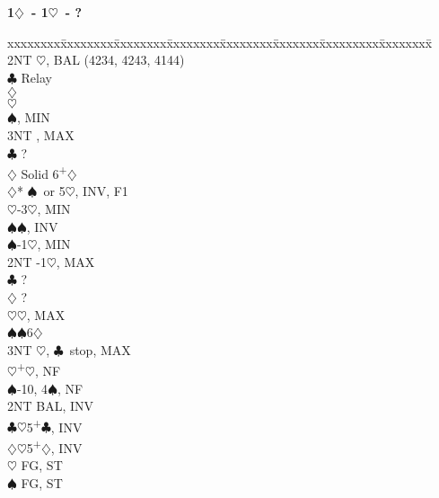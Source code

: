 \documentclass[10pt]{article}
\renewcommand{\c}{$\clubsuit$}
\renewcommand{\d}{$\diamondsuit$}
\newcommand{\h}{$\heartsuit$}
\newcommand{\s}{$\spadesuit$}
\newcommand{\p}{\textsuperscript{+}}
\newenvironment{bidtable}[1][]
{\textbf{#1}
  \begin{adjustwidth}{1em}{}
    \addvspace{2pt}
    \begin{tabbing}
      xxxxxxxx\=xxxxxxxx\=xxxxxxxx\=xxxxxxxx\=xxxxxxxx\=xxxxxxx\=xxxxxxxxx\=xxxxxxxx\=\kill}
{\end{tabbing}\end{adjustwidth}\bigskip}%
\begin{document}
\begin{bidtable}[1\d\ - 1\h\ - ?]
     \>      \> 2NT \h, BAL (4234, 4243, 4144)              \\
     \>      \>     \c  \> Relay                            \\
     \>      \>     \>      \d   {}                    \\
     \>      \>     \>      \h   {}                    \\
     \>      \>     \>      \s   {}, MIN               \\
     \>      \>     \>      \> 3NT   , MAX               \\
     \>      \c \> ?                                        \\
     \>      \d \> Solid 6\p\d                              \\
     \d* {}\s\ or 5\h, INV, F1                            \\
     \>      \h {}-3\h, MIN                               \\
     \>      \>     \s  {}\s, INV                         \\
     \>      \s {}-1\h, MIN                               \\
     \>      \> 2NT -1\h, MAX                               \\
     \>      \c \> ?                                        \\
     \>      \d \> ?                                        \\
     \>      \h {}\h, MAX                                 \\
     \>      \s {}\s 6\d                                  \\
     \>      \> 3NT \h, \c\ stop, MAX                       \\
     \h  {}\p\h, NF                                       \\
     \s  {}-10, 4\s, NF                                   \\
     \> 2NT  \> BAL, INV                                        \\
     \c  {}\h 5\p\c, INV                                  \\
     \d  {}\h 5\p\d, INV                                  \\
     \h  \> FG, ST                                          \\
     \s  \> FG, ST                                          \\

\end{bidtable}
\end{document}
